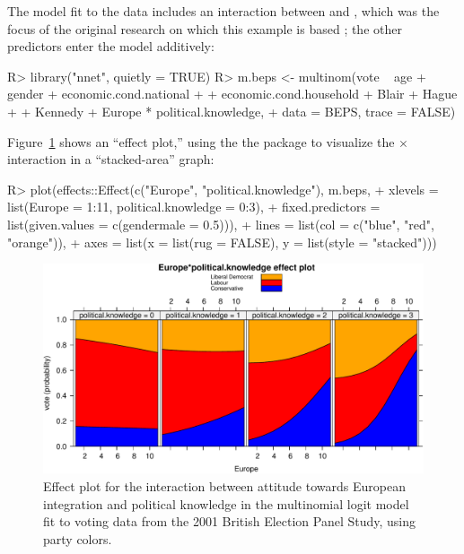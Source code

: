 \documentclass[
]{jss}
\begin{document}
The model fit to the data includes an interaction between 
and , which was the focus of the original
research on which this example is based
\citep{AndersenHeathSinnott:2002}; the other predictors enter the model
additively:

\begin{CodeChunk}
\begin{CodeInput}
R> library("nnet", quietly = TRUE)
R> m.beps <- multinom(vote ~ age + gender + economic.cond.national
+                         + economic.cond.household + Blair + Hague
+                         + Kennedy + Europe * political.knowledge,
+                    data = BEPS, trace = FALSE)
\end{CodeInput}
\end{CodeChunk}

Figure~\ref{fig:BEPS-plot} shows an ``effect plot,'' using the the
 package \citep{FoxWeisberg:2019} to visualize the
 \(\times\)  interaction in a
``stacked-area'' graph:

\begin{CodeChunk}
\begin{CodeInput}
R> plot(effects::Effect(c("Europe", "political.knowledge"), m.beps,
+             xlevels = list(Europe = 1:11, political.knowledge = 0:3),
+             fixed.predictors = list(given.values = c(gendermale = 0.5))),
+      lines = list(col = c("blue", "red", "orange")),
+      axes = list(x = list(rug = FALSE), y = list(style = "stacked")))
\end{CodeInput}
\begin{figure}

{\centering \includegraphics{jss5535_files/figure-latex/BEPS-plot-1}

}

\caption[Effect plot for the interaction between attitude towards European integration and political knowledge in the multinomial logit model fit to voting data from the 2001 British Election Panel Study, using party colors]{Effect plot for the interaction between attitude towards European integration and political knowledge in the multinomial logit model fit to voting data from the 2001 British Election Panel Study, using party colors.}\label{fig:BEPS-plot}
\end{figure}
\end{CodeChunk}
\end{document}
